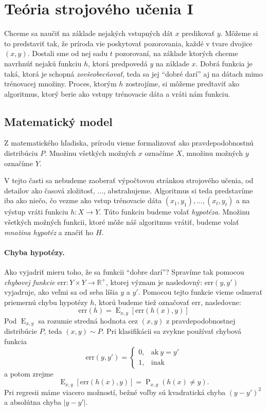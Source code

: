 \documentclass[a4paper,11pt]{article}
\theoremstyle{plain}
\theoremstyle{remark}
\theoremstyle{definition}
\newcommand{\err}{\mathrm{err}}
\newcommand{\reals}{\mathbb{R}}
\DeclareMathOperator*{\prob}{\mathrm{P}}
\DeclareMathOperator*{\E}{\mathrm{E}}
\begin{document}
  
  
  \section{Teória strojového učenia I}
  
  Chceme sa naučiť na základe nejakých vstupných dát $x$ predikovať $y$.
  Môžeme si to predstaviť tak, že príroda vie poskytovať pozorovania,
  každé v tvare dvojice $(x, y)$. Dostali sme od nej sadu $t$ pozorovaní,
  na základe ktorých chceme navrhnúť nejakú funkciu $h$, ktorá predpovedá
  $y$ na základe $x$. Dobrá funkcia je taká, ktorá je schopná
  \emph{zovšeobecňovať}, teda sa jej ``dobré darí'' aj na dátach mimo
  trénovacej množiny. Proces, ktorým $h$ zostrojíme, si môžeme predtaviť
  ako algoritmus, ktorý berie ako vstupy trénovacie dáta a vráti nám
  funkciu.
  
  
  \subsection{Matematický model}
  
  Z matematického hľadiska, prírodu vieme formalizovať ako
  pravdepodobnostnú distribúciu $P$. Množinu všetkých možných
  $x$ označíme $X$, množinu možných $y$ označíme $Y$.
  
  V tejto časti sa nebudeme zaoberať výpočtovou stránkou strojového
  učenia, od detailov ako časová zložitosť, ..., abstrahujeme. Algoritmus
  si teda predstavíme iba ako niečo, čo vezme ako vstup trénovacie dáta
  $(x_1, y_1), \ldots, (x_t, y_t)$ a na výstup vráti funkciu
  $h : X \to Y$. Túto funkciu budeme volať \emph{hypotéza}. Množinu
  všetkých možných funkcii, ktoré môže náš algoritmus vrátiť,
  budeme volať \emph{množina hypotéz} a značiť ho $H$.
  
  \paragraph{Chyba hypotézy.}
  Ako vyjadriť mieru toho, že sa funkcii ``dobre darí''? Spravíme tak
  pomocou \emph{chybovej funkcie} $\err : Y \times Y \to \reals^+$,
  ktorej význam je nasledovný: $\err(y, y')$ vyjadruje, ako veľmi
  sa od seba líšia $y$ a $y'$. Pomocou tejto funkcie vieme odmerať
  priemernú chybu hypotézy $h$, ktorú budeme tiež označovať $\err$,
  nasledovne:
  $$\err(h) = \E_{x, y} \left[ \err(h(x), y) \right]$$
  Pod $\E_{x, y}$ sa rozumie stredná hodnota cez $(x, y)$
  z pravdepodobnostnej distribúcie $P$, teda $(x, y) \sim P$.
  Pri klasifikácii sa zvykne používať chybová funkcia
  $$
    \err(y, y') = \left\{
      \begin{array}{ll}
        0, & \text{ak}\ y = y' \\
        1, & \text{inak}
      \end{array}
    \right.
  $$
  a potom zrejme
  $$\E_{x, y} \left[ \err(h(x), y) \right] = \prob_{x, y} \left( h(x) \neq y \right).$$
  Pri regresii máme viacero možností, bežné voľby sú kvadratická chyba
  $(y - y')^2$ a absolútna chyba $|y - y'|$.
  
\end{document}

